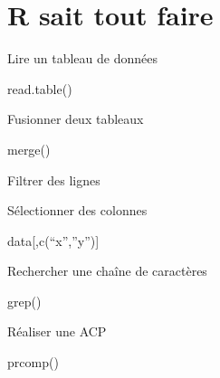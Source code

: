 \documentclass[
]{book}
\newenvironment{Shaded}{\begin{snugshade}}{\end{snugshade}}
\newcommand{\DecValTok}[1]{\textcolor[rgb]{0.00,0.00,0.81}{#1}}
\newcommand{\FunctionTok}[1]{\textcolor[rgb]{0.00,0.00,0.00}{#1}}
\newcommand{\NormalTok}[1]{#1}
\newcommand{\SpecialCharTok}[1]{\textcolor[rgb]{0.00,0.00,0.00}{#1}}
\begin{document}
\hypertarget{r-sait-tout-faire}{%
\section{R sait tout faire}\label{r-sait-tout-faire}}

Lire un tableau de données

\begin{Shaded}
\begin{Highlighting}[]
\FunctionTok{read.table}\NormalTok{()}
\end{Highlighting}
\end{Shaded}

Fusionner deux tableaux

\begin{Shaded}
\begin{Highlighting}[]
\FunctionTok{merge}\NormalTok{()}
\end{Highlighting}
\end{Shaded}

Filtrer des lignes

\begin{Shaded}
\end{Shaded}

Sélectionner des colonnes

\begin{Shaded}
\begin{Highlighting}[]
\NormalTok{data[,}\FunctionTok{c}\NormalTok{(“x”,”y”)]}
\end{Highlighting}
\end{Shaded}

Rechercher une chaîne de caractères

\begin{Shaded}
\begin{Highlighting}[]
\FunctionTok{grep}\NormalTok{()}
\end{Highlighting}
\end{Shaded}

Réaliser une ACP

\begin{Shaded}
\begin{Highlighting}[]
\FunctionTok{prcomp}\NormalTok{()}
\end{Highlighting}
\end{Shaded}
\end{document}
